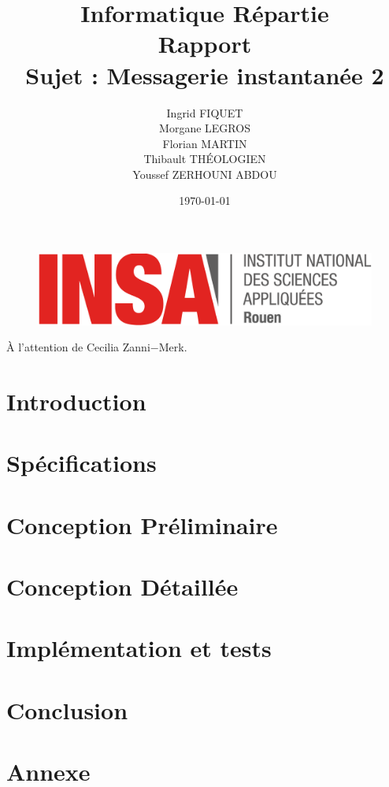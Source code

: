 \documentclass[a4paper,12pt]{article}
\title{Informatique Répartie\\Rapport\\Sujet : Messagerie instantanée 2}
\author{Ingrid FIQUET\\Morgane LEGROS\\Florian MARTIN\\Thibault THÉOLOGIEN\\Youssef ZERHOUNI ABDOU}
\date{\today}
\begin{document}
	\begin{titlepage}
		\vfill
		\begin{figure}
			\includegraphics[scale=0.3]{img/logoINSARouen.png}
		\end{figure}

		\maketitle
		
		\begin{center}
			\addvspace{10mm}
			À l'attention de Cecilia Zanni$-$Merk.
		\end{center}

		\vfill
		\noindent \hrulefill

	\end{titlepage}



\newpage
\tableofcontents{}

\newpage
\part*{Introduction} 
	

\newpage
\part{Spécifications}
	
	
\newpage
\part{Conception Préliminaire}
	
	
\newpage
\part{Conception Détaillée}
	

\newpage
\part{Implémentation et tests}
	
	
\newpage
\part*{Conclusion}
	

\newpage
\part*{Annexe}
\end{document}
